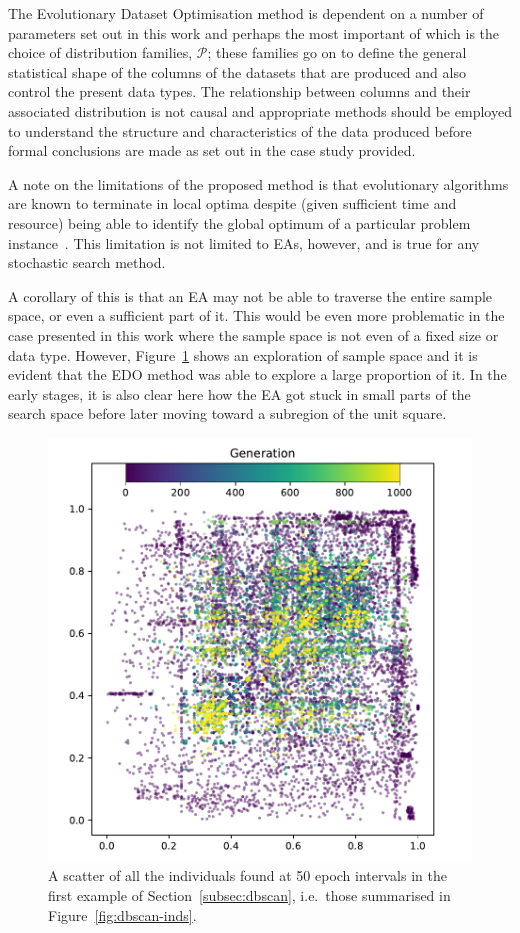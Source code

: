 \documentclass[smallextended]{svjour3}
\newlength{\imgwidth}
\begin{document}
The Evolutionary Dataset Optimisation method is dependent on a number of
parameters set out in this work and perhaps the most important of which is the
choice of distribution families, \(\mathcal{P}\); these families go on to define
the general statistical shape of the columns of the datasets that are produced
and also control the present data types. The relationship between columns and
their associated distribution is not causal and appropriate methods should be
employed to understand the structure and characteristics of the data produced
before formal conclusions are made as set out in the case study provided.

A note on the limitations of the proposed method is that evolutionary algorithms
are known to terminate in local optima despite (given sufficient time and
resource) being able to identify the global optimum of a particular problem
instance~\cite{Vikhar2016}. This limitation is not limited to EAs, however,
and is true for any stochastic search method.

A corollary of this is that an EA may not be able to traverse the entire sample
space, or even a sufficient part of it. This would be even more problematic in
the case presented in this work where the sample space is not even of a fixed
size or data type. However, Figure~\ref{fig:coverage} shows an exploration of
sample space and it is evident that the EDO method was able to explore a large
proportion of it. In the early stages, it is also clear here how the EA got
stuck in small parts of the search space before later moving toward a subregion
of the unit square.

\begin{figure}[htbp]
    \includegraphics[width=\imgwidth]{Fig15.pdf}
    \caption{%
        A scatter of all the individuals found at 50 epoch intervals in the
        first example of Section~\ref{subsec:dbscan}, i.e.\ those summarised in
        Figure~\ref{fig:dbscan-inds}.
    }\label{fig:coverage}
\end{figure}
\end{document}
